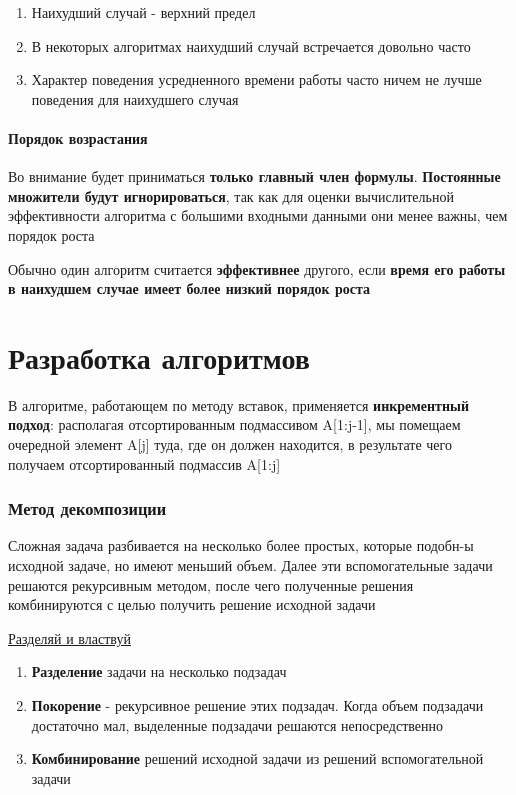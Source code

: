 \documentclass[a4paper, 12pt]{article}
\begin{document}
\begin{enumerate}
    \item Наихудший случай - верхний предел
    \item В некоторых алгоритмах наихудший случай встречается довольно часто
    \item Характер поведения усредненного времени работы часто ничем не лучше поведения для наихудшего случая
\end{enumerate}

\subsection{Порядок возрастания}

Во внимание будет приниматься \textbf{только главный член формулы}. \textbf{Постоянные множители будут игнорироваться},
так как для оценки вычислительной эффективности алгоритма с большими входными данными они менее важны, чем порядок роста

Обычно один алгоритм считается \textbf{эффективнее} другого, если \textbf{время его работы в наихудшем случае имеет более низкий порядок роста}

\part{Разработка алгоритмов}

В алгоритме, работающем по методу вставок, применяется \textbf{инкрементный подход}: располагая отсортированным 
подмассивом A[1:j-1], мы помещаем очередной элемент A[j] туда, где он должен находится,
в результате чего получаем отсортированный подмассив A[1:j]

\section{Метод декомпозиции}

Сложная задача разбивается на несколько более простых, которые подобн-ы исходной задаче, но имеют меньший объем.
Далее эти вспомогательные задачи решаются рекурсивным методом, после чего 
полученные решения комбинируются с целью получить решение исходной задачи

\underline{Разделяй и властвуй}

\begin{enumerate}
    \item \textbf{Разделение} задачи на несколько подзадач
    \item \textbf{Покорение} - рекурсивное решение этих подзадач. Когда объем подзадачи достаточно мал, 
    выделенные подзадачи решаются непосредственно
    \item \textbf{Комбинирование} решений исходной задачи из решений вспомогательной задачи 
\end{enumerate}
\end{document}
